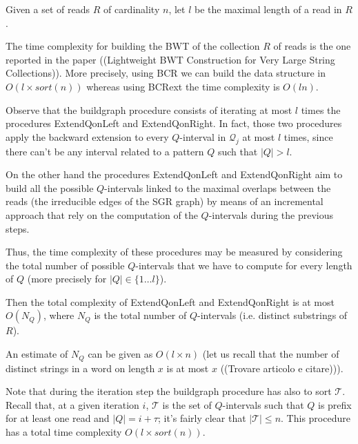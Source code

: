 \documentclass[runningheads,envcountsame,a4paper]{llncs}
\begin{document}
Given a set of reads $R$ of cardinality $n$, let $l$ be the maximal
length of a read in $R$.


The time complexity for building the BWT of the collection $R$ of reads
is the one reported in the paper ((Lightweight BWT Construction for Very
Large String Collections)\cite{}).
More precisely, using BCR we can build the data structure in
$O(l\times sort(n))$ whereas using BCRext the time complexity
is $O(ln)$.

Observe that the buildgraph procedure consists of iterating at most $l$
times the procedures ExtendQonLeft and ExtendQonRight.
In fact, those two procedures
apply the backward extension to every $Q$-interval in $\mathcal{Q}_j$ at
most $l$ times, since there can't be any interval related to a pattern
$Q$ such that $|Q| > l$. %

On the other hand the procedures ExtendQonLeft and ExtendQonRight aim to
build all the possible $Q$-intervals linked to the maximal overlaps
between the reads (the irreducible edges of the SGR graph) by means of
an incremental approach that rely on the computation of the
$Q$-intervals during the previous steps.

Thus, the time complexity of these procedures may be measured by
considering the total number of possible $Q$-intervals that we have to
compute for every length of $Q$ (more precisely for $|Q| \in \{1 \dots
l\}$).

Then the total  complexity of ExtendQonLeft and ExtendQonRight is at
most $O(N_Q)$, where $N_Q$ is the total number of
$Q$-intervals (i.e. distinct substrings of $R$).

An estimate of $N_Q$ can be given as $O(l \times n)$ (let us recall that
the number of distinct strings in a word on length $x$ is  at most $x$
((Trovare articolo e citare)\cite{})).

Note that during the iteration step the buildgraph procedure has also to
sort $\mathcal{T}$.
Recall that, at a given iteration $i$, $\mathcal{T}$ is the set of
$Q$-intervals such that $Q$ is prefix for at least one read and $|Q| = i
+ \tau$; it's fairly clear that $|\mathcal{T}| \leq n$.
This procedure has a total time complexity $O(l \times
sort(n))$.
\end{document}
